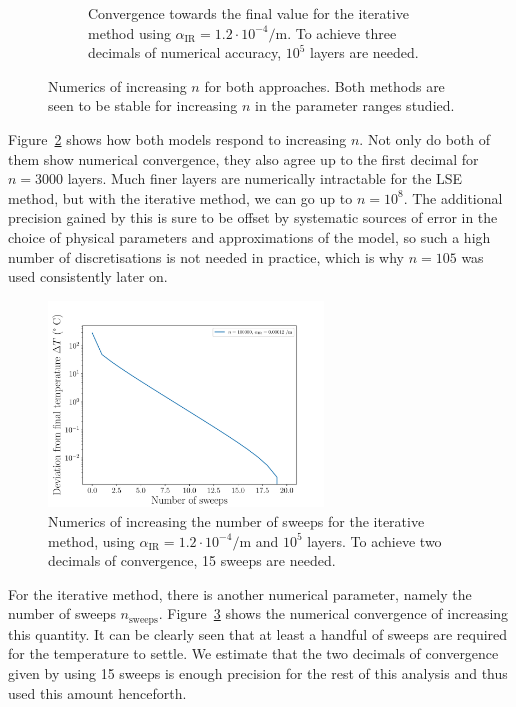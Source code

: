 \documentclass[a4paper,DIV=12,english]{scrartcl}
\begin{document}
\begin{figure}
\begin{subfigure}{0.49\textwidth}
        \caption{Convergence towards the final value for the iterative method using $\alpha_{\text{IR}}=1.2\cdot 10^{-4}/\text{m}$. To achieve three decimals of numerical accuracy, $10^5$ layers are needed.}
        \label{subfig:N_it}        
    \end{subfigure}    
    \caption{Numerics of increasing $n$ for both approaches. Both methods are seen to be stable for increasing $n$ in the parameter ranges studied.}
    \label{fig:N}
\end{figure}

Figure~\ref{fig:N} shows how both models respond to increasing $n$. Not only do both of them show numerical convergence, they also agree up to the first decimal for $n=3000$ layers. Much finer layers are numerically intractable for the LSE method, but with the iterative method, we can go up to $n=10^8$. The additional precision gained by this is sure to be offset by systematic sources of error in the choice of physical parameters and approximations of the model, so such a high number of discretisations is not needed in practice, which is why $n=105$ was used consistently later on.
\begin{figure}
    \centering
    \includegraphics[width=0.65\textwidth]{../plots/temp_full_it/full_sweeps.pdf}
    \caption{Numerics of increasing the number of sweeps for the iterative method, using $\alpha_{\text{IR}}=1.2\cdot 10^{-4}/\text{m}$ and $10^5$ layers. To achieve two decimals of convergence, 15 sweeps are needed.}
    \label{fig:sweeps}
\end{figure}

For the iterative method, there is another numerical parameter, namely the number of sweeps $n_\text{sweeps}$. Figure~\ref{fig:sweeps} shows the numerical convergence of increasing this quantity. It can be clearly seen that at least a handful of sweeps are required for the temperature to settle. We estimate that the two decimals of convergence given by using 15 sweeps is enough precision for the rest of this analysis and thus used this amount henceforth.
\end{document}
